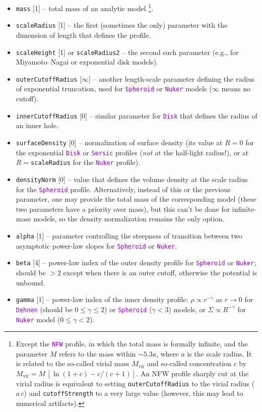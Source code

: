 \documentclass[12pt]{article}
\newcommand{\ttt}[1]{\textcolor{darkviolet}{\texttt{#1}}}
\newcommand{\ppp}[1]{\textcolor{darkolive} {\texttt{#1}}}
\begin{document}
\begin{itemize}
\item \ppp{mass} [1] -- total mass of an analytic model%
\footnote{Except the \ttt{NFW} profile, in which the total mass is formally infinite, and the parameter $M$ refers to the mass within $\sim 5.3a$, where $a$ is the scale radius. It is related to the so-called virial mass $M_\mathrm{vir}$ and so-called concentration $c$ by $M_\mathrm{vir}=M\,[\ln(1+c)-c/(c+1)]$. An NFW profile sharply cut at the virial radius is equivalent to setting \ppp{outerCutoffRadius} to the virial radius ($a\,c$) and \ppp{cutoffStrength} to a very large value (however, this may lead to numerical artifacts).}.
\item \ppp{scaleRadius} [1] -- the first (sometimes the only) parameter with the dimension of length that defines the profile.
\item \ppp{scaleHeight} [1] or \ppp{scaleRadius2} -- the second such parameter (e.g., for Miyamoto--Nagai or exponential disk models).
\item \ppp{outerCutoffRadius} [$\infty$] -- another length-scale parameter defining the radius of exponential truncation, used for \ttt{Spheroid} or \ttt{Nuker} models ($\infty$ means no cutoff).
\item \ppp{innerCutoffRadius} [0] -- similar parameter for \ttt{Disk} that defines the radius of an inner hole.
\item \ppp{surfaceDensity} [0] -- normalization of surface density (its value at $R=0$ for the exponential \ttt{Disk} or \ttt{Sersic} profiles (\textit{not} at the half-light radius!), or at $R=$\ppp{scaleRadius} for the \ttt{Nuker} profile).
\item \ppp{densityNorm} [0] -- value that defines the volume density at the scale radius for the \ttt{Spheroid} profile. Alternatively, instead of this or the previous parameter, one may provide the total mass of the corresponding model (these two parameters have a priority over mass), but this can't be done for infinite-mass models, so the density normalization remains the only option.
\item \ppp{alpha} [1] -- parameter controlling the steepness of transition between two asymptotic power-law slopes for \ttt{Spheroid} or \ttt{Nuker}.
\item \ppp{beta} [4] -- power-law index of the outer density profile for \ttt{Spheroid} or \ttt{Nuker}; should be $>2$ except when there is an outer cutoff, otherwise the potential is unbound.
\item \ppp{gamma} [1] -- power-law index of the inner density profile: $\rho \propto r^{-\gamma}$ as $r\to 0$ for \ttt{Dehnen} (should be $0\le\gamma\le 2$) or \ttt{Spheroid} ($\gamma<3$) models, or $\Sigma \propto R^{-\gamma}$ for \ttt{Nuker} model ($0\le \gamma < 2$).

\end{itemize}
\end{document}
